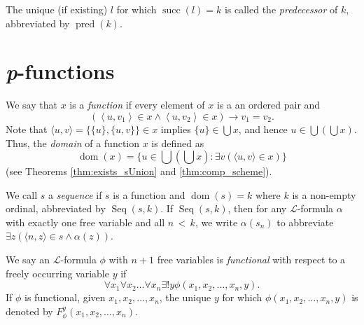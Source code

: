 \begin{definition}[Predecessor]
    \label{def:IsOrd.pred}
    \leanok
    The unique (if existing) $l$ for which $\operatorname{succ}(l) = k$ is called the 
    \textit{predecessor} of $k$, abbreviated by $\operatorname{pred}(k)$.
\end{definition}

\section{\textit{p}-functions}

\begin{definition}
    \label{def:IsFunc+IsFunc.dom}
    \leanok
    We say that $x$ is a \textit{function} if every element of $x$ is a an ordered pair and
    $$ 
    \left(\left\langle u, v_1\right\rangle \in x \wedge\left\langle u, v_2\right\rangle 
    \in x\right) \rightarrow v_1=v_2.
    $$
    Note that $\langle u, v\rangle = \{\{u\}, \{u,v\}\} \in x$ implies $\{u\} \in \bigcup x$, and 
    hence $u \in \bigcup\left(\bigcup x\right)$.
    Thus, the \textit{domain} of a function $x$ is defined as
    $$
    \operatorname{dom}(x)=\{u \in \bigcup\left(\bigcup x\right): 
    \exists v(\langle u, v\rangle \in x)\}
    $$
    (see Theorems \ref{thm:exists_sUnion} and \ref{thm:comp_scheme}).
\end{definition}

\begin{definition}[Sequence]
    \label{def:IsSeq}
    \leanok
    We call $s$ a \textit{sequence} if $s$ is a function and $\operatorname{dom}(s)=k$ 
    where $k$ is a non-empty ordinal, abbreviated by $\operatorname{Seq}(s,k)$.
    If $\operatorname{Seq}(s,k)$, then for any $\mathcal{L}$-formula $\alpha$ with exactly one free
    variable and all $n\,<\,k$, we write $\alpha(s_n)$ to abbreviate 
    $\exists z (\langle n, z\rangle \in s \land \alpha(z))$.
\end{definition}

\begin{definition}[Functional]
    \label{def:IsFunctional}
    We say an $\mathcal{L}$-formula $\phi$ with $n+1$ free variables is \textit{functional} 
    with respect to a freely occurring variable $y$ if 
    $$
    \forall x_1 \forall x_2 \ldots \forall x_n \exists! y  \phi (x_1, x_2, \ldots, x_n, y).
    $$
    If $\phi$ is functional, given $x_1, x_2, \ldots, x_n$, the unique $y$ for which
    $\phi (x_1, x_2, \ldots, x_n, y)$ is denoted by $F_\phi^y(x_1, x_2, \ldots, x_n)$.
\end{definition}